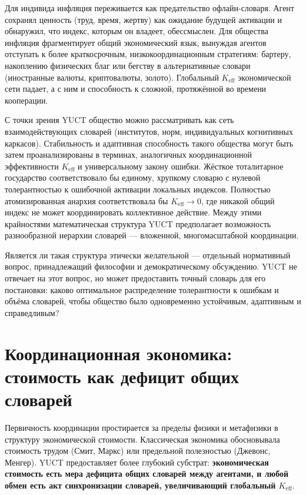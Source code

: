 \documentclass[12pt,a4paper]{article}
\begin{document}
	Для индивида инфляция переживается как предательство офлайн-словаря. Агент сохранял ценность (труд, время, жертву) как ожидание будущей активации и обнаружил, что индекс, которым он владеет, обессмыслен. Для общества инфляция фрагментирует общий экономический язык, вынуждая агентов отступать к более краткосрочным, низкокоординационным стратегиям: бартеру, накоплению физических благ или бегству в альтернативные словари (иностранные валюты, криптовалюты, золото). Глобальный \(K_{\mathrm{eff}}\) экономической сети падает, а с ним и способность к сложной, протяжённой во времени кооперации.
	
	С точки зрения YUCT общество можно рассматривать как сеть взаимодействующих словарей (институтов, норм, индивидуальных когнитивных каркасов). Стабильность и адаптивная способность такого общества могут быть затем проанализированы в терминах, аналогичных координационной эффективности \(K_{\mathrm{eff}}\) и универсальному закону ошибки. Жёсткое тоталитарное государство соответствовало бы единому, хрупкому словарю с нулевой толерантностью к ошибочной активации локальных индексов. Полностью атомизированная анархия соответствовала бы \(K_{\mathrm{eff}} \to 0\), где никакой общий индекс не может координировать коллективное действие. Между этими крайностями математическая структура YUCT предполагает возможность разнообразной иерархии словарей — вложенной, многомасштабной координации.
	
	Является ли такая структура этически желательной — отдельный нормативный вопрос, принадлежащий философии и демократическому обсуждению. YUCT не отвечает на этот вопрос, но может предоставить точный словарь для его постановки: каково оптимальное распределение толерантности к ошибкам и объёма словарей, чтобы общество было одновременно устойчивым, адаптивным и справедливым?
	
	\section{Координационная экономика: стоимость как дефицит общих словарей}
	\label{sec:coordination-economics}
	
	Первичность координации простирается за пределы физики и метафизики в структуру экономической стоимости. Классическая экономика обосновывала стоимость трудом (Смит, Маркс) или предельной полезностью (Джевонс, Менгер). YUCT предоставляет более глубокий субстрат: \textbf{экономическая стоимость есть мера дефицита общих словарей между агентами, и любой обмен есть акт синхронизации словарей, увеличивающий глобальный \(K_{\mathrm{eff}}\)}.
	
\end{document}
